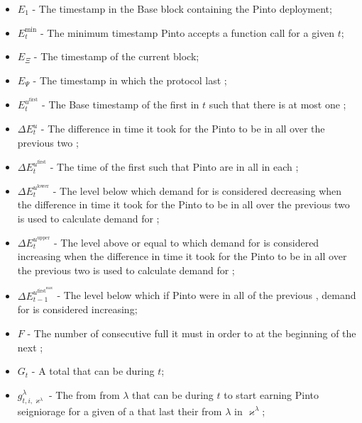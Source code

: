 \documentclass[class=article, crop=false]{standalone}
\begin{document}
\begin{itemize}[topsep=0pt, itemsep=3pt,leftmargin=16pt]
    \item[] $E_{1}$ - The timestamp in the Base block containing the Pinto deployment;
    \item[] $E_{t}^{\text{min}}$ - The minimum timestamp Pinto accepts a  function call for a given $t$;
    \item[] $E_{\Xi}$ - The timestamp of the current block;
    \item[] $E_\Psi$ - The timestamp in which the protocol last ;
    \item[] $E_{t}^{u^{\text{first}}}$ - The Base timestamp of the first  in $t$ such that there is at most one ;
    \item[] $\Delta E_{t}^{u}$ - The difference in time it took for the Pinto to be  in all  over the previous two ;
    \item[] $\Delta E_{t}^{u^{\text{first}}}$ - The time of the first  such that Pinto are  in all  in each ;
    \item[] $\Delta E_{t}^{u^{\text{lower}}}$ - The level below which demand for  is considered decreasing when the difference in time it took for the Pinto to be  in all  over the previous two  is used to calculate demand for ;
    \item[] $\Delta E_{t}^{u^{\text{upper}}}$ - The level above or equal to which demand for  is considered increasing when the difference in time it took for the Pinto to be  in all  over the previous two  is used to calculate demand for ;
    \item[] $\Delta E_{t-1}^{u^{\text{first}^{\text{max}}}}$ - The level below which if Pinto were  in all  of the previous , demand for  is considered increasing;
    \item[] $F$ - The number of consecutive full  it must  in order to  at the beginning of the next ;
    \item[] $G_{t}$ - A  total  that can be  during $t$;
    \item[] $g_{t,i,\varkappa^{\lambda}}^{\lambda}$ - The  from  from $\lambda$  that can be  during $t$ to start earning Pinto seigniorage for a given  of a  that last  their  from $\lambda$  in $\varkappa^{\lambda}$;

\end{itemize}
\end{document}
